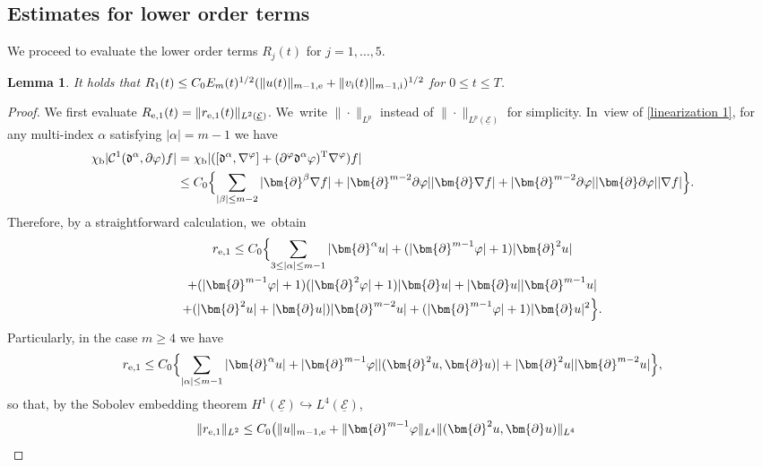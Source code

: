 \documentclass[JEP,XML,SOM,Unicode,NoFloatCountersInSection,published]{cedram}
\newcommand{\cE}{{\mathcal E}}
\newcommand{\ul}[1]{\underline{#1}}
\newtheorem{lemma}[theorem]{Lemma}
\theoremstyle{definition}
\begin{document}
\subsection{Estimates for lower order terms}\label{sectestLOT}
We proceed to evaluate the lower order terms $R_j(t)$ for $j=1,\ldots,5$.

\begin{lemma}\label{lem:EstR1}
It holds that $R_1(t) \leq C_0E_m(t)^{1/2}(\|u(t)\|_{m-1,{\rm e}}+\|v_\mathrm{i}(t)\|_{m-1,{\rm i}})^{1/2}$ for $0\leq t\leq T$.
\end{lemma}

\begin{proof}
We first evaluate $R_{{\rm e},1}(t)=\|r_{{\rm e},1}(t)\|_{L^2(\ul{\cE})}$. We~write $\|\cdot\|_{L^p}$ instead of $\|\cdot\|_{L^p(\ul{\cE})}$ for simplicity. In~view of \eqref{linearization 1}, for any multi-index $\alpha$ satisfying $|\alpha|=m-1$ we have
\begin{align*}
\chi_\mathrm{b}|{\mathcal C}^1(\mathfrak{d}^\alpha,\partial \varphi)f|
&= \chi_\mathrm{b}|([\mathfrak{d}^\alpha,\nabla^\varphi]+(\partial^\varphi\mathfrak{d}^\alpha\varphi)^{\rm T}\nabla^\varphi)f| \\
&\leq C_0 \Bigl\{ \sum_{|\beta|\leq m-2}|\bm{\partial}^\beta\nabla f| + |\bm{\partial}^{m-2}\partial\varphi||\bm{\partial}\nabla f|
+ |\bm{\partial}^{m-2}\partial\varphi||\bm{\partial}\partial\varphi||\nabla f| \Bigr\}.
\end{align*}
Therefore, by a straightforward calculation, we~obtain
\begin{multline*}
r_{{\rm e},1}
\leq C_0\Bigl\{ \sum_{3\leq|\alpha|\leq m-1}|\bm{\partial}^\alpha u| + (|\bm{\partial}^{m-1}\varphi|+1)|\bm{\partial}^2u| \\
+ (|\bm{\partial}^{m-1}\varphi|+1)(|\bm{\partial}^2\varphi|+1)|\bm{\partial}u| + |\bm{\partial}u||\bm{\partial}^{m-1}u| \\
+ (|\bm{\partial}^2u|+|\bm{\partial}u|)|\bm{\partial}^{m-2}u| + (|\bm{\partial}^{m-1}\varphi|+1)|\bm{\partial}u|^2 \Bigr\}.
\end{multline*}
Particularly, in the case $m\geq 4$ we have
\[
r_{{\rm e},1}
\leq C_0 \Bigl\{ \sum_{|\alpha|\leq m-1}|\bm{\partial}^\alpha u| + |\bm{\partial}^{m-1}\varphi||(\bm{\partial}^2u,\bm{\partial}u)|
+ |\bm{\partial}^2u||\bm{\partial}^{m-2}u| \Bigr\},
\]
so that, by the Sobolev embedding theorem $H^1(\ul{\cE}) \hookrightarrow L^4(\ul{\cE})$,
\begin{align*}
\|r_{{\rm e},1}\|_{L^2}
&\leq C_0 \bigl(\|u\|_{m-1,{\rm e}} + \|\bm{\partial}^{m-1}\varphi\|_{L^4}\|(\bm{\partial}^2u,\bm{\partial}u)\|_{L^4}

\end{align*}
\end{proof}
\end{document}
